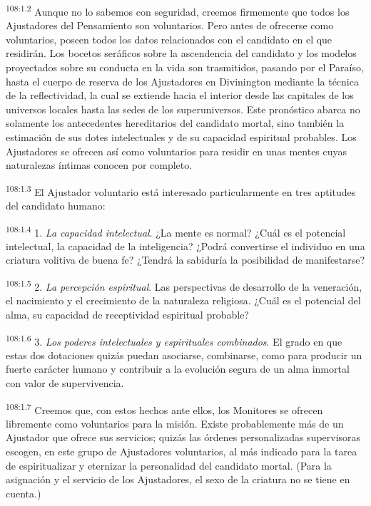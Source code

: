 \par
\textsuperscript{108:1.2} Aunque no lo sabemos con seguridad, creemos firmemente que todos los Ajustadores del Pensamiento son voluntarios. Pero antes de ofrecerse como voluntarios, poseen todos los datos relacionados con el candidato en el que residirán. Los bocetos seráficos sobre la ascendencia del candidato y los modelos proyectados sobre su conducta en la vida son trasmitidos, pasando por el Paraíso, hasta el cuerpo de reserva de los Ajustadores en Divinington mediante la técnica de la reflectividad, la cual se extiende hacia el interior desde las capitales de los universos locales hasta las sedes de los superuniversos. Este pronóstico abarca no solamente los antecedentes hereditarios del candidato mortal, sino también la estimación de sus dotes intelectuales y de su capacidad espiritual probables. Los Ajustadores se ofrecen así como voluntarios para residir en unas mentes cuyas naturalezas íntimas conocen por completo.

\par
\textsuperscript{108:1.3} El Ajustador voluntario está interesado particularmente en tres aptitudes del candidato humano:

\par
\textsuperscript{108:1.4} 1. \textit{La capacidad intelectual}. ¿La mente es normal? ¿Cuál es el potencial intelectual, la capacidad de la inteligencia? ¿Podrá convertirse el individuo en una criatura volitiva de buena fe? ¿Tendrá la sabiduría la posibilidad de manifestarse?

\par
\textsuperscript{108:1.5} 2. \textit{La percepción espiritual}. Las perspectivas de desarrollo de la veneración, el nacimiento y el crecimiento de la naturaleza religiosa. ¿Cuál es el potencial del alma, su capacidad de receptividad espiritual probable?

\par
\textsuperscript{108:1.6} 3. \textit{Los poderes intelectuales y espirituales combinados}. El grado en que estas dos dotaciones quizás puedan asociarse, combinarse, como para producir un fuerte carácter humano y contribuir a la evolución segura de un alma inmortal con valor de supervivencia.

\par
\textsuperscript{108:1.7} Creemos que, con estos hechos ante ellos, los Monitores se ofrecen libremente como voluntarios para la misión. Existe probablemente más de un Ajustador que ofrece sus servicios; quizás las órdenes personalizadas supervisoras escogen, en este grupo de Ajustadores voluntarios, al más indicado para la tarea de espiritualizar y eternizar la personalidad del candidato mortal. (Para la asignación y el servicio de los Ajustadores, el sexo de la criatura no se tiene en cuenta.)

